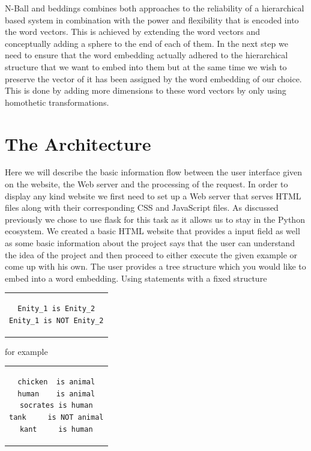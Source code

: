 \documentclass[]{article}
\begin{document}
N-Ball and beddings combines both approaches to the reliability of a hierarchical based system in combination with the power and flexibility that is encoded into the word vectors. This is achieved by extending the word vectors and conceptually adding a sphere to the end of each of them. In the next step we need to ensure that the word embedding actually adhered to the hierarchical structure that we want to embed into them but at the same time we wish to preserve the vector of it has been assigned by the word embedding of our choice. This is done by adding more dimensions to these word vectors by only using homothetic transformations.

\section{The Architecture}
\label{sec::arch}
Here we will describe the basic information flow between the user interface given on the website, the Web server and the processing of the request. In order to display any kind website we first need to set up a Web server that serves HTML files along with their corresponding CSS and JavaScript files. As discussed previously we chose to use flask for this task as it allows us to stay in the Python ecosystem. We created a basic HTML website that provides a input field as well as some basic information about the project says that the user can understand the idea of the project and then proceed to either execute the given example or come up with his own. 
The user provides a tree structure which you would like to embed into a word embedding. Using statements with a fixed structure
\begin{center}

\begin{tabular}{c}
\begin{lstlisting}
Enity_1 is Enity_2
Enity_1 is NOT Enity_2
\end{lstlisting}
\end{tabular}

for example

\begin{tabular}{c}
\begin{lstlisting}
chicken  is animal
human    is animal
socrates is human
tank     is NOT animal
kant     is human

\end{lstlisting}
\end{tabular}
\end{center}
\end{document}
